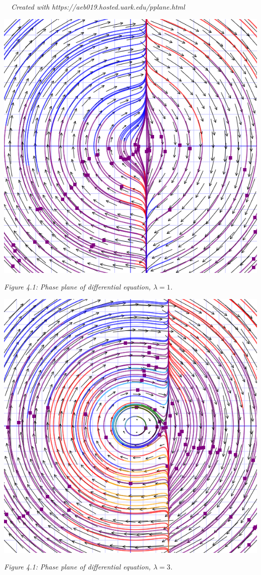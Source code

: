 \documentclass[11pt]{article}
\begin{document}
    \begin{solution}\textit{$\text{ }$ \newline Created with https://aeb019.hosted.uark.edu/pplane.html}
        \begin{center}
            \includegraphics[scale=0.3]{41.png}
        \end{center}
        \begin{center}
            \textit{Figure 4.1: Phase plane of differential equation, $\lambda = 1$.}
        \end{center}
        \begin{center}
            \includegraphics[scale=0.3]{43.png}
        \end{center}
        \begin{center}
            \textit{Figure 4.1: Phase plane of differential equation, $\lambda = 3$.}
        \end{center}
    \end{solution}
\end{document}

